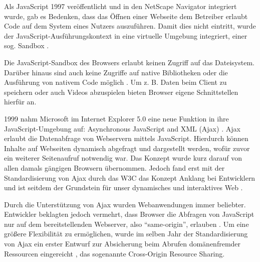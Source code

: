 
Als JavaScript 1997 veröffentlicht und in den NetScape Navigator integriert wurde, gab es Bedenken, dass das Öffnen einer Webseite dem Betreiber erlaubt Code auf dem System eines Nutzers auszuführen. Damit dies nicht eintritt, wurde der JavaScript-Ausführungskontext in eine virtuelle Umgebung integriert, einer sog. Sandbox \cite{LearningJavaScript}.

Die JavaScript-Sandbox des Browsers erlaubt keinen Zugriff auf das Dateisystem. Darüber hinaus sind auch keine Zugriffe auf native Bibliotheken oder die Ausführung von nativem Code möglich \cite{TheSpyInTheSandbox}. Um z. B. Daten beim Client zu speichern oder auch Videos abzuspielen bieten Browser eigene Schnittstellen hierfür an.


1999 nahm Microsoft im Internet Explorer 5.0 eine neue Funktion in ihre JavaScript-Umgebung auf: Asynchronous JavaScript and XML (Ajax) \cite{MDNAjax}. Ajax erlaubt die Datenabfrage von Webservern mittels JavaScript. Hierdurch können Inhalte auf Webseiten dynamisch abgefragt und dargestellt werden, wofür zuvor ein weiterer Seitenaufruf notwendig war. Das Konzept wurde kurz darauf von allen damals gängigen Browsern übernommen. Jedoch fand erst mit der Standardisierung von Ajax durch das W3C \cite{TheXMLHttpRequestObject} das Konzept Anklang bei Entwicklern \cite{AngularForEnterpriseReadyWebApplications} \cite{FinkIntroducingSPAs} und ist seitdem der Grundstein für unser dynamisches und interaktives Web \cite{ResearchOnAJAXTechnology}.

Durch die Unterstützung von Ajax wurden Webanwendungen immer beliebter. Entwickler beklagten jedoch vermehrt, dass Browser die Abfragen von JavaScript nur auf dem bereitstellenden Webserver, also \enquote{same-origin}, erlauben \cite{CrossSiteXHRWithCORS}. Um eine größere Flexibilität zu ermöglichen, wurde im selben Jahr der Standardisierung von Ajax ein erster Entwurf zur Absicherung beim Abrufen domänenfremder Ressourcen eingereicht \cite{AuthorizingCORS}, das sogenannte Cross-Origin Resource Sharing.

